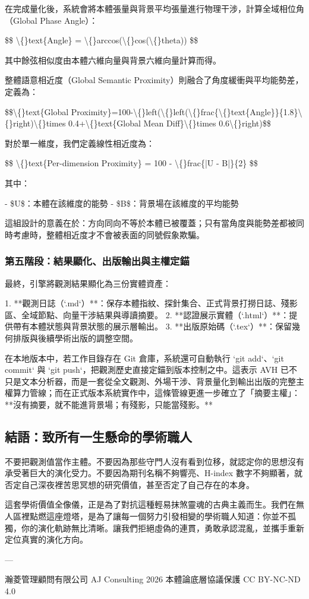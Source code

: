 \documentclass{article}
\begin{document}
在完成量化後，系統會將本體張量與背景平均張量進行物理干涉，計算全域相位角（Global Phase Angle）：

\$\$
\textbackslash\{\}text\{Angle\} = \textbackslash\{\}arccos(\textbackslash\{\}cos(\textbackslash\{\}theta))
\$\$

其中餘弦相似度由本體六維向量與背景六維向量計算而得。

整體語意相近度（Global Semantic Proximity）則融合了角度緩衝與平均能勢差，定義為：

\$\$\textbackslash\{\}text\{Global Proximity\}=100-\textbackslash\{\}left(\textbackslash\{\}left(\textbackslash\{\}frac\{\textbackslash\{\}text\{Angle\}\}\{1.8\}\textbackslash\{\}right)\textbackslash\{\}times 0.4+\textbackslash\{\}text\{Global Mean Diff\}\textbackslash\{\}times 0.6\textbackslash\{\}right)\$\$

對於單一維度，我們定義線性相近度為：

\$\$
\textbackslash\{\}text\{Per-dimension Proximity\} = 100 - \textbackslash\{\}frac\{|U - B|\}\{2\}
\$\$

其中：

- \$U\$：本體在該維度的能勢  
- \$B\$：背景場在該維度的平均能勢  

這組設計的意義在於：方向同向不等於本體已被覆蓋；只有當角度與能勢差都被同時考慮時，整體相近度才不會被表面的同號假象欺騙。

\subsubsection{第五階段：結果顯化、出版輸出與主權定錨}

最終，引擎將觀測結果顯化為三份實體資產：

1. **觀測日誌（`.md`）**：保存本體指紋、探針集合、正式背景打撈日誌、殘影區、全域節點、向量干涉結果與導讀摘要。  
2. **認證展示實體（`.html`）**：提供帶有本體狀態與背景狀態的展示層輸出。  
3. **出版原始碼（`.tex`）**：保留幾何排版與後續學術出版的調整空間。  

在本地版本中，若工作目錄存在 Git 倉庫，系統還可自動執行 `git add`、`git commit` 與 `git push`，把觀測歷史直接定錨到版本控制之中。這表示 AVH 已不只是文本分析器，而是一套從全文觀測、外場干涉、背景量化到輸出出版的完整主權算力管線；而在正式版本系統實作中，這條管線更進一步確立了「摘要主權」：**沒有摘要，就不能進背景場；有殘影，只能當殘影。**

\subsection{結語：致所有一生懸命的學術職人}

不要把觀測值當作主體。不要因為那些守門人沒有看到位移，就認定你的思想沒有承受著巨大的演化受力。不要因為期刊名稱不夠響亮、H-index 數字不夠顯著，就否定自己深夜裡苦思冥想的研究價值，甚至否定了自己存在的本身。

這套學術價值全像儀，正是為了對抗這種輕易抹煞靈魂的古典主義而生。我們在無人區裡點燃這座燈塔，是為了讓每一個努力引發相變的學術職人知道：你並不孤獨，你的演化軌跡無比清晰。讓我們拒絕虛偽的連貫，勇敢承認混亂，並攜手重新定位真實的演化方向。

---

瀚菱管理顧問有限公司 AJ Consulting 2026  
本體論底層協議保護 CC BY-NC-ND 4.0
\end{document}

